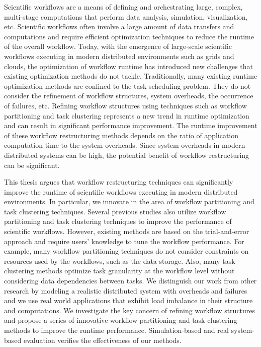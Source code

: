 Scientific workflows are a means of defining and orchestrating large, complex, multi-stage computations that perform data analysis, simulation, visualization, etc.
Scientific workflows often involve a large amount of data transfers and computations and require efficient optimization techniques to reduce the runtime of the overall workflow. 
Today, with the emergence of large-scale scientific workflows executing in modern distributed environments such as grids and clouds, the optimization of workflow runtime has introduced new challenges that existing optimization methods do not tackle. Traditionally, many existing runtime optimization methods are confined to the task scheduling problem. They do not consider the refinement of workflow structures, system overheads, the occurrence of failures, etc. Refining workflow structures using techniques such as workflow partitioning and task clustering represents a new trend in runtime optimization and can result in significant performance improvement. 
The runtime improvement of these workflow restructuring methods depends on the ratio of application computation time to the system overheads. Since system overheads in modern distributed systems can be high, the potential benefit of workflow restructuring can be significant.

This thesis argues that workflow restructuring techniques can significantly improve the runtime of scientific workflows executing in modern distributed environments. In particular, we innovate in the area of workflow partitioning and task clustering techniques. Several previous studies also utilize workflow partitioning and task clustering techniques to improve the performance of scientific workflows. However, existing methods are based on the trial-and-error approach and require users' knowledge to tune the workflow performance. For example, many workflow partitioning techniques do not consider constraints on resources used by the workflows, such as the data storage. Also, many task clustering methods optimize task granularity at the workflow level without considering data dependencies between tasks. We distinguish our work from other research by modeling a realistic distributed system with overheads and failures and we use real world applications that exhibit load imbalance in their structure and computations.
We investigate the key concern of refining workflow structures and propose a series of innovative workflow partitioning and task clustering methods to improve the runtime performance. Simulation-based and real system-based evaluation verifies the effectiveness of our methods. 


